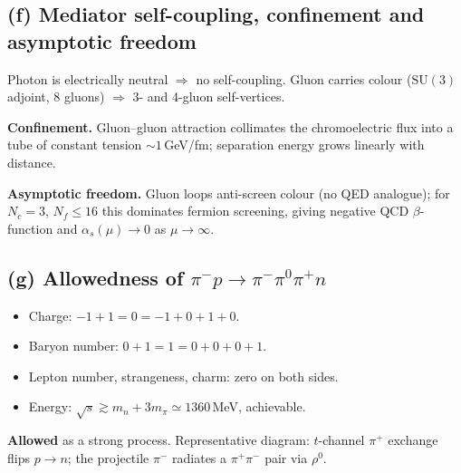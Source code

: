 \documentclass[11pt]{article}
\begin{document}
\begin{center}
\end{center}

\subsection*{(f) Mediator self-coupling, confinement and asymptotic freedom}

Photon is electrically neutral $\Rightarrow$ no self-coupling. Gluon carries colour ($\mathrm{SU(3)}$ adjoint, 8 gluons) $\Rightarrow$ 3- and 4-gluon self-vertices.

\textbf{Confinement.} Gluon--gluon attraction collimates the chromoelectric flux into a tube of constant tension $\sim 1$\,GeV/fm; separation energy grows linearly with distance.

\textbf{Asymptotic freedom.} Gluon loops anti-screen colour (no QED analogue); for $N_c=3$, $N_f\le 16$ this dominates fermion screening, giving negative QCD $\beta$-function and $\alpha_s(\mu)\to 0$ as $\mu\to\infty$.

\subsection*{(g) Allowedness of $\pi^- p\to\pi^-\pi^0\pi^+ n$}

\begin{itemize}
\item Charge: $-1+1=0=-1+0+1+0$. \checkmark
\item Baryon number: $0+1=1=0+0+0+1$. \checkmark
\item Lepton number, strangeness, charm: zero on both sides. \checkmark
\item Energy: $\sqrt s\gtrsim m_n+3m_\pi\simeq 1360$\,MeV, achievable.
\end{itemize}
\textbf{Allowed} as a strong process. Representative diagram: $t$-channel $\pi^+$ exchange flips $p\to n$; the projectile $\pi^-$ radiates a $\pi^+\pi^-$ pair via $\rho^0$.
\end{document}
